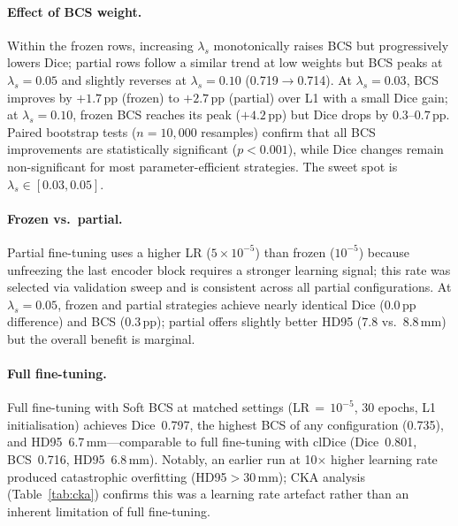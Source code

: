 \documentclass[runningheads]{llncs}
\begin{document}
\paragraph{Effect of BCS weight.}
Within the frozen rows, increasing $\lambda_s$ monotonically raises BCS but progressively lowers Dice; partial rows follow a similar trend at low weights but BCS peaks at $\lambda_s{=}0.05$ and slightly reverses at $\lambda_s{=}0.10$ (0.719${\to}$0.714).
At $\lambda_s{=}0.03$, BCS improves by $+1.7$\,pp (frozen) to $+2.7$\,pp (partial) over L1 with a small Dice gain; at $\lambda_s{=}0.10$, frozen BCS reaches its peak ($+4.2$\,pp) but Dice drops by $0.3$--$0.7$\,pp.
Paired bootstrap tests ($n{=}10{,}000$ resamples) confirm that all BCS improvements are statistically significant ($p{<}0.001$), while Dice changes remain non-significant for most parameter-efficient strategies.
The sweet spot is $\lambda_s \in [0.03, 0.05]$.

\paragraph{Frozen vs.\ partial.}
Partial fine-tuning uses a higher LR ($5{\times}10^{-5}$) than frozen ($10^{-5}$) because unfreezing the last encoder block requires a stronger learning signal; this rate was selected via validation sweep and is consistent across all partial configurations.
At $\lambda_s{=}0.05$, frozen and partial strategies achieve nearly identical Dice ($0.0$\,pp difference) and BCS ($0.3$\,pp); partial offers slightly better HD95 (7.8 vs.\ 8.8\,mm) but the overall benefit is marginal.

\paragraph{Full fine-tuning.}
Full fine-tuning with Soft BCS at matched settings (LR$\,{=}\,10^{-5}$, 30 epochs, L1 initialisation) achieves Dice~0.797, the highest BCS of any configuration (0.735), and HD95~6.7\,mm---comparable to full fine-tuning with clDice (Dice~0.801, BCS~0.716, HD95~6.8\,mm).
Notably, an earlier run at 10$\times$ higher learning rate produced catastrophic overfitting (HD95${>}$30\,mm); CKA analysis (Table~\ref{tab:cka}) confirms this was a learning rate artefact rather than an inherent limitation of full fine-tuning.
\end{document}
